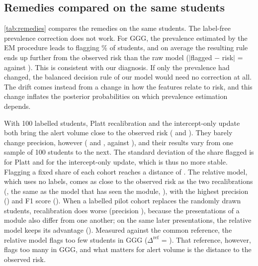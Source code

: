 \documentclass[journal]{IEEEtran}
\newcommand{\dref}{\Delta^{\mathrm{ref}}}
\begin{document}
\subsection{Remedies compared on the same students}
\label{sec:remedies}
\cref{tab:remedies} compares the remedies on the same students. The label-free prevalence correction does not work. For GGG, the prevalence estimated by the EM procedure leads to flagging \resEmGGGFlag\% of students, and on average the resulting rule ends up further from the observed risk than the raw model ($|$flagged $-$ risk$|$ = \resEmGapRisk{} against \resGapRiskRaw). This is consistent with our diagnosis. If only the prevalence had changed, the balanced decision rule of our model would need no correction at all. The drift comes instead from a change in how the features relate to risk, and this change inflates the posterior probabilities on which prevalence estimation depends.

With 100 labelled students, Platt recalibration and the intercept-only update both bring the alert volume close to the observed risk (\resGapRiskRecal{} and \resIcptGapRisk). They barely change precision, however (\resPrecRecalK{} and \resIcptPrec, against \resPrecRawK), and their results vary from one sample of 100 students to the next. The standard deviation of the share flagged is \resPlattSdFlag{} for Platt and \resIcptSdFlag{} for the intercept-only update, which is thus no more stable. Flagging a fixed share of each cohort reaches a distance of \resGapRiskTopQ. The relative model, which uses no labels, comes as close to the observed risk as the two recalibrations (\resGapRiskRel, the same as the model that has seen the module, \resGapRiskRefA), with the highest precision (\resPrecRelK) and F1 score (\resFoneRelK). When a labelled pilot cohort replaces the randomly drawn students, recalibration does worse (precision \resPrecRecalPilot), because the presentations of a module also differ from one another; on the same later presentations, the relative model keeps its advantage (\resPrecRelPilot). Measured against the common reference, the relative model flags too few students in GGG ($\dref$ = \resGGGDriftRelCommon). That reference, however, flags too many in GGG, and what matters for alert volume is the distance to the observed risk.


\end{document}
